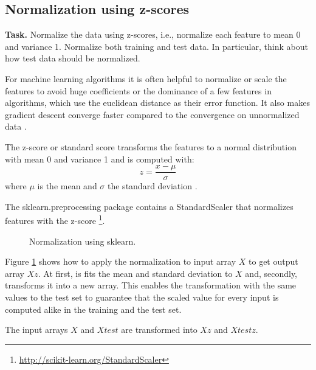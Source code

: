 \documentclass{support/acm_proc_article-sp}
\begin{document}
    \subsection{Normalization using z-scores}
    \vspace{\baselineskip}

    \textbf{Task.} Normalize the data using z-scores, i.e., normalize each feature to mean 0 and variance 1.
    Normalize both training and test data.
    In particular, think about how test data should be normalized.

    For machine learning algorithms it is often helpful to normalize or scale the features to avoid huge
    coefficients or the dominance of a few features in algorithms, which use the euclidean distance as their error function.
    It also makes gradient descent converge faster compared to the convergence on unnormalized data \cite{DBLP:journals/corr/IoffeS15}.

    The z-score or standard score transforms the features to a normal distribution with mean 0 and variance 1 and is
    computed with:
    \begin{equation}
        z = \frac{x - \mu}{\sigma}
        \label{eq:z-score}
    \end{equation}
    where $\mu$ is the mean and $\sigma$ the standard deviation \cite{standardization}.

    The sklearn.preprocessing package contains a StandardScaler that normalizes features with the z-score
    \footnote{\href{http://scikit-learn.org/stable/modules/generated/sklearn.preprocessing.StandardScaler.html}{http://scikit-learn.org/StandardScaler}}.

    \begin{figure}[htbp]
        \centering
        \lstset{numbers=none,xleftmargin=0em}
        
        \caption{Normalization using sklearn.}
        \label{fig:normalization}
    \end{figure}

    Figure \ref{fig:normalization} shows how to apply the normalization to input array $X$ to get output array $Xz$.
    At first, is fits the mean and standard deviation to $X$ and, secondly, transforms it into a new array.
    This enables the transformation with the same values to the test set to guarantee that the scaled value
    for every input is computed alike in the training and the test set.

    The input arrays $X$ and $Xtest$ are transformed into $Xz$ and $Xtestz$.
\end{document}
